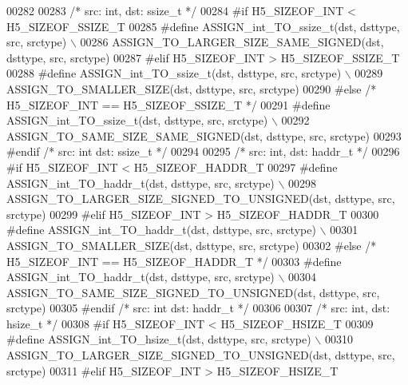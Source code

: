 \begin{DoxyCode}
00282 
00283 \textcolor{comment}{/* src: int, dst: ssize\_t */}
00284 \textcolor{preprocessor}{#if H5\_SIZEOF\_INT < H5\_SIZEOF\_SSIZE\_T}
00285 \textcolor{preprocessor}{    #define ASSIGN\_int\_TO\_ssize\_t(dst, dsttype, src, srctype) \(\backslash\)}
00286 \textcolor{preprocessor}{        ASSIGN\_TO\_LARGER\_SIZE\_SAME\_SIGNED(dst, dsttype, src, srctype)}
00287 \textcolor{preprocessor}{#elif H5\_SIZEOF\_INT > H5\_SIZEOF\_SSIZE\_T}
00288 \textcolor{preprocessor}{    #define ASSIGN\_int\_TO\_ssize\_t(dst, dsttype, src, srctype) \(\backslash\)}
00289 \textcolor{preprocessor}{        ASSIGN\_TO\_SMALLER\_SIZE(dst, dsttype, src, srctype)}
00290 \textcolor{preprocessor}{#else }\textcolor{comment}{/* H5\_SIZEOF\_INT == H5\_SIZEOF\_SSIZE\_T */}\textcolor{preprocessor}{}
00291 \textcolor{preprocessor}{    #define ASSIGN\_int\_TO\_ssize\_t(dst, dsttype, src, srctype) \(\backslash\)}
00292 \textcolor{preprocessor}{        ASSIGN\_TO\_SAME\_SIZE\_SAME\_SIGNED(dst, dsttype, src, srctype)}
00293 \textcolor{preprocessor}{#endif }\textcolor{comment}{/* src: int dst: ssize\_t */}\textcolor{preprocessor}{}
00294 
00295 \textcolor{comment}{/* src: int, dst: haddr\_t */}
00296 \textcolor{preprocessor}{#if H5\_SIZEOF\_INT < H5\_SIZEOF\_HADDR\_T}
00297 \textcolor{preprocessor}{    #define ASSIGN\_int\_TO\_haddr\_t(dst, dsttype, src, srctype) \(\backslash\)}
00298 \textcolor{preprocessor}{        ASSIGN\_TO\_LARGER\_SIZE\_SIGNED\_TO\_UNSIGNED(dst, dsttype, src, srctype)}
00299 \textcolor{preprocessor}{#elif H5\_SIZEOF\_INT > H5\_SIZEOF\_HADDR\_T}
00300 \textcolor{preprocessor}{    #define ASSIGN\_int\_TO\_haddr\_t(dst, dsttype, src, srctype) \(\backslash\)}
00301 \textcolor{preprocessor}{        ASSIGN\_TO\_SMALLER\_SIZE(dst, dsttype, src, srctype)}
00302 \textcolor{preprocessor}{#else }\textcolor{comment}{/* H5\_SIZEOF\_INT == H5\_SIZEOF\_HADDR\_T */}\textcolor{preprocessor}{}
00303 \textcolor{preprocessor}{    #define ASSIGN\_int\_TO\_haddr\_t(dst, dsttype, src, srctype) \(\backslash\)}
00304 \textcolor{preprocessor}{        ASSIGN\_TO\_SAME\_SIZE\_SIGNED\_TO\_UNSIGNED(dst, dsttype, src, srctype)}
00305 \textcolor{preprocessor}{#endif }\textcolor{comment}{/* src: int dst: haddr\_t */}\textcolor{preprocessor}{}
00306 
00307 \textcolor{comment}{/* src: int, dst: hsize\_t */}
00308 \textcolor{preprocessor}{#if H5\_SIZEOF\_INT < H5\_SIZEOF\_HSIZE\_T}
00309 \textcolor{preprocessor}{    #define ASSIGN\_int\_TO\_hsize\_t(dst, dsttype, src, srctype) \(\backslash\)}
00310 \textcolor{preprocessor}{        ASSIGN\_TO\_LARGER\_SIZE\_SIGNED\_TO\_UNSIGNED(dst, dsttype, src, srctype)}
00311 \textcolor{preprocessor}{#elif H5\_SIZEOF\_INT > H5\_SIZEOF\_HSIZE\_T}

\end{DoxyCode}
